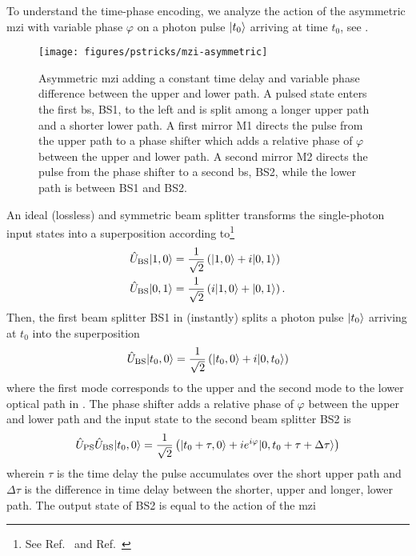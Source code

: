 To understand the time-phase encoding, we analyze the action of the asymmetric \gls{mzi} with variable phase $\varphi$ on a photon pulse $\lvert t_0\rangle$ arriving at time $t_0$, see .
\begin{figure}[htb]
    \centering
    \texttt{[image: figures/pstricks/mzi-asymmetric]}
     \caption{Asymmetric \gls{mzi} adding a constant time delay and variable phase difference between the upper and lower path. A pulsed state enters the first \gls{bs}, BS1, to the left and is split among a longer upper path and a shorter lower path. A first mirror M1 directs the pulse from the upper path to a phase shifter which adds a relative phase of $\varphi$ between the upper and lower path. A second mirror M2 directs the pulse from the phase shifter to a second \gls{bs}, BS2, while the lower path is between BS1 and BS2.}\label{fig:mzi_asymmetric}
\end{figure}
An ideal (lossless) and symmetric beam splitter transforms the single-photon input states into a superposition according to\footnote{See Ref.~\cite[p.~137]{Haroche2006} and Ref.~\cite[p.~143]{Gerry2005}}
\begin{align}
	\hat{U}_\text{BS}
	\lvert1,0\rangle
	&=
	\frac{1}{\sqrt{2}}
	\left(\lvert1,0\rangle+i\lvert0,1\rangle\right)
	\\
	\hat{U}_\text{BS}
	\lvert0,1\rangle
	&=
	\frac{1}{\sqrt{2}}
	\left(i\lvert1,0\rangle+\lvert0,1\rangle\right)
	.
\end{align}
Then, the first beam splitter BS1 in  (instantly) splits a photon pulse $\lvert t_0\rangle$ arriving at $t_0$ into the superposition
\begin{equation}
	\hat{U}_\text{BS}
	\lvert t_0,0\rangle
	=
	\frac{1}{\sqrt{2}}
	\left(\lvert t_0,0\rangle+i\lvert0,t_0\rangle\right)
\end{equation}
where the first mode corresponds to the upper and the second mode to the lower optical path in .
The phase shifter adds a relative phase of $\varphi$ between the upper and lower path and the input state to the second beam splitter BS2 is
\begin{equation}
	\hat{U}_\text{PS}
	\hat{U}_\text{BS}
	\lvert t_0,0\rangle
	=
	\frac{1}{\sqrt{2}}
	\left(
		\lvert t_0+\tau,0\rangle
		+
		ie^{i\varphi}
		\lvert0,t_0+\tau+\Delta\tau\rangle
	\right)
\end{equation}
wherein $\tau$ is the time delay the pulse accumulates over the short upper path and $\Delta\tau$ is the difference in time delay between the shorter, upper and longer, lower path.
The output state of BS2 is equal to the action of the \gls{mzi}
